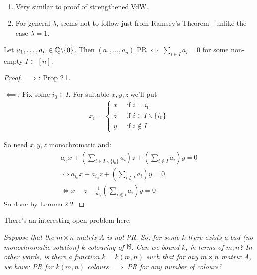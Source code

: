 \documentclass[10pt]{article}
\begin{document}
\begin{remark*}[Remarks]\ 
    \begin{enumerate}
        \item Very similar to proof of strengthened VdW.
        \item For general $\lambda$, seems not to follow just from Ramsey's Theorem - unlike the case $\lambda = 1$.
    \end{enumerate}
\end{remark*}

\begin{theorem}
    Let $a_1,\dots,a_n \in \mathbb{Q}\backslash \{0\}$. Then $(a_1,\dots,a_n)$ PR $\iff$ $\sum_{i\in I}a_i = 0$ for some non-empty $I\subset [n]$.    
\end{theorem}
\begin{proof}
    \underline{$\implies$}: Prop 2.1.

    \underline{$\impliedby$}: Fix some $i_0 \in I$. For suitable $x,y,z$ we'll put
    \begin{align*}
        x_i = \left\lbrace \begin{array}{cc} x\ &\textrm{ if }i = i_0\\ z\ &\textrm{ if }i\in I \backslash \{i_0\}\\ y\ &\textrm{ if }i\not\in I \end{array}\right.
    \end{align*}

So need $x,y,z$ monochromatic and:
\begin{align*}
    a_{i_0}x + \left(\sum_{i\in I\backslash \{i_0\}}a_i\right)z + \left(\sum_{i\not\in I}a_i\right) y = 0\\
    \iff a_{i_0}x - a_{i_0}z + \left(\sum_{i\not\in I}a_i\right)y = 0\\
    \iff x - z + \frac{1}{a_{i_0}}\left(\sum_{i\not\in I}a_i\right)y = 0 
\end{align*}
So done by Lemma 2.2.
\end{proof}

There's an interesting open problem here:

\begin{remark*}
    \emph{
        Suppose that the $m\times n$ matrix $A$ is not PR. So, for some $k$ there exists a bad (no monochromatic solution) $k$-colouring of $\mathbb{N}$. Can we bound $k$, in terms of $m,n$?
    }
    \emph{
        In other words, is there a function $k = k(m,n)$ such that for any $m\times n$ matrix $A$, we have: PR for $k(m,n)$ colours $\implies$ PR for any number of colours?
    }
\end{remark*}
\end{document}
